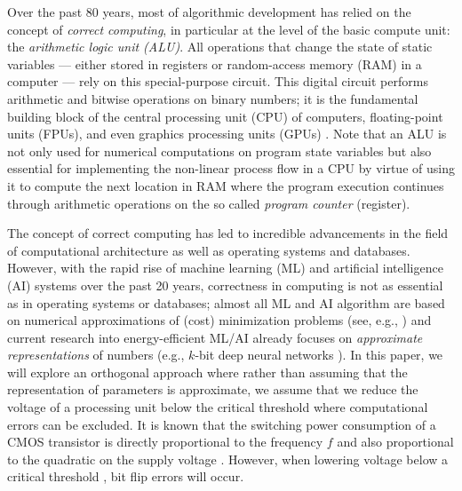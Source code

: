 Over the past 80 years, most of algorithmic development has relied on the concept of {\em correct computing}, in particular at the level of the basic compute unit: the {\em arithmetic logic unit (ALU)}. All operations that change the state of static variables --- either stored in registers or random-access memory (RAM) in a computer --- rely on this special-purpose circuit. This digital circuit performs arithmetic and bitwise operations on binary numbers; it is the fundamental building block of the central processing unit (CPU) of computers, floating-point units (FPUs), and even graphics processing units (GPUs) \cite{HamVraZak2012i}. Note that an ALU is not only used for numerical computations on program state variables but also essential for implementing the non-linear process flow in a CPU by virtue of using it to compute the next location in RAM where the program execution continues through arithmetic operations on the so called {\em program counter} (register). 

The concept of correct computing has led to incredible advancements in the field of computational architecture as well as operating systems and databases. However, with the rapid rise of machine learning (ML) and artificial intelligence (AI) systems over the past 20 years, correctness in computing is not as essential as in operating systems or databases; almost all ML and AI algorithm are based on numerical approximations of (cost) minimization problems (see, e.g., \cite{Mit1997a,Bis2006i,Mur2012q}) and current research into energy-efficient ML/AI already focuses on {\em approximate representations} of numbers (e.g., $k$-bit deep neural networks \cite{CouBenDav2015y}). In this paper, we will explore an orthogonal approach where rather than assuming that the representation of parameters is approximate, we assume that we reduce the voltage of a processing unit below the critical threshold where computational errors can be excluded. It is known that the switching power consumption of a CMOS transistor is directly proportional to the frequency $f$ and also proportional to the quadratic on the supply voltage \cite[Subsection 4.1.2]{St2014a}. However, when lowering voltage below a critical threshold \cite{OnuYukSal2020g}, bit flip errors will occur.

